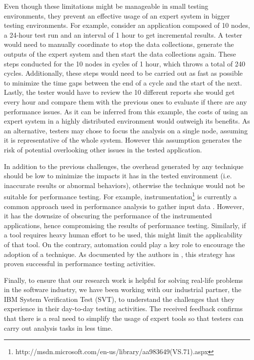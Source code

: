 \documentclass[runningheads,a4paper]{llncs}
\begin{document}
Even though these limitations might be manageable in small testing environments,
they prevent an effective usage of an expert system in bigger testing
environments. For example, consider an application composed of 10 nodes, a
24-hour test run and an interval of 1 hour to get incremental results. A tester
would need to manually coordinate to stop the data collections, generate the
outputs of the expert system and then start the data collections again. These
steps conducted for the 10 nodes in cycles of 1 hour, which throws a total of
240 cycles. Additionally, these steps would need to be carried out as fast as
possible to minimize the time gaps between the end of a cycle and the start of
the next. Lastly, the tester would have to review the 10 different reports she
would get every hour and compare them with the previous ones to evaluate if
there are any performance issues. As it can be inferred from this example, the
costs of using an expert system in a highly distributed environment would
outweigh its benefits. As an alternative, testers may chose to focus the analysis on a single node, assuming it is representative of the whole system. However this
assumption generates the risk of potential overlooking other issues in the
tested application.

In addition to the previous challenges, the overhead generated by any technique
should be low to minimize the impacts it has in the tested environment (i.e.
inaccurate results or abnormal behaviors), otherwise the technique would not be
suitable for performance testing. For example,
instrumentation\footnote{http://msdn.microsoft.com/en-us/library/aa983649(VS.71).aspx}
is currently a common approach used in performance analysis to gather input data
\cite{Yang1,Hangal1,Csallner1,Chen2}. However, it has the downsize of obscuring
the performance of the instrumented applications, hence compromising the results of 
performance testing. Similarly, if a tool requires heavy human effort to be
used, this might limit the applicability of that tool. On the contrary, automation 
could play a key role to encourage the adoption of a technique. As documented by
the authors in \cite{Shahamiri1}, this strategy has proven successful in
performance testing activities.

Finally, to ensure that our research work is helpful for solving real-life
problems in the software industry, we have been working with our industrial
partner, the IBM System Verification Test (SVT), to understand the challenges
that they experience in their day-to-day testing activities. The received
feedback confirms that there is a real need to simplify the usage of expert
tools so that testers can carry out analysis tasks in less time.
\end{document}
